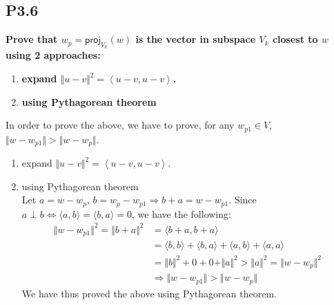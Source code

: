 \documentclass[12pt]{article}
\begin{document}
\subsection*{P3.6}
\textbf{Prove that $w_p=\mathsf{proj}_{V_k}(w)$ is the vector in subspace $V_k$ closest to $w$ using 2 approaches: }
\begin{enumerate}
\item \textbf{expand $\Vert u-v \Vert^2= \left \langle u-v,u-v \right \rangle$.}
\item \textbf{using Pythagorean theorem}
\end{enumerate}
In order to prove the above, we have to prove, for any $w_{p1} \in V$, $\Vert w-w_{p1} \Vert > \Vert w-w_{p}\Vert$.
\begin{enumerate}
\item expand $\Vert u-v \Vert^2= \left \langle u-v,u-v \right \rangle$.
\item using Pythagorean theorem\\
	 Let $a = w - w_{p}$, $b = w_p - w_{p1} \Rightarrow b + a = w - w_{p1}$. Since $a \perp b \Leftrightarrow \langle a,b\rangle = \langle b,a\rangle = 0$, we have the following:
	\begin{align*}
	\Vert w-w_{p1} \Vert^2 = \Vert b+a \Vert^2 &= \langle b+a,b+a \rangle\\
	&= \langle b,b\rangle + \langle b,a \rangle + \langle a,b\rangle + \langle a,a \rangle\\
	&= \Vert b \Vert^2 + 0 + 0 + \Vert a \Vert^2 > \Vert a \Vert^2 = \Vert w-w_p\Vert^2\\
	&\Rightarrow \Vert w-w_{p1} \Vert > \Vert w-w_p\Vert
	\end{align*}
We have thus proved the above using Pythagorean theorem.
\end{enumerate}

\end{document}
